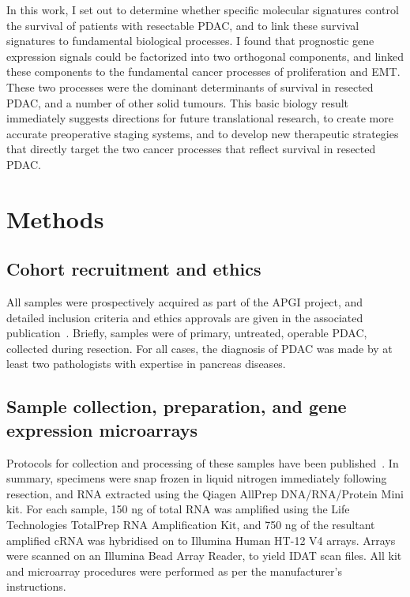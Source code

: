 \documentclass[dissertation.tex]{subfiles}
\begin{document}
In this work, I set out to determine whether specific molecular signatures control the survival of patients with resectable \gls{PDAC}, and to link these survival signatures to fundamental biological processes.  I found that prognostic gene expression signals could be factorized into two orthogonal components, and linked these components to the fundamental cancer processes of proliferation and \gls{EMT}.  These two processes were the dominant determinants of survival in resected \gls{PDAC}, and a number of other solid tumours.  This basic biology result immediately suggests directions for future translational research, to create more accurate preoperative staging systems, and to develop new therapeutic strategies that directly target the two cancer processes that reflect survival in resected \gls{PDAC}.

\section{Methods}
\subsection{Cohort recruitment and ethics}
All samples were prospectively acquired as part of the \gls{APGI} project, and detailed inclusion criteria and ethics approvals are given in the associated publication~\cite{Biankin2012}.  Briefly, samples were of primary, untreated, operable \gls{PDAC}, collected during resection.  For all cases, the diagnosis of \gls{PDAC} was made by at least two pathologists with expertise in pancreas diseases.

\subsection{Sample collection, preparation, and gene expression microarrays}
Protocols for collection and processing of these samples have been published~\cite{Biankin2012}.  In summary, specimens were snap frozen in liquid nitrogen immediately following resection, and RNA extracted using the Qiagen AllPrep DNA/RNA/Protein Mini kit.  For each sample, 150 ng of total RNA was amplified using the Life Technologies TotalPrep RNA Amplification Kit, and 750 ng of the resultant amplified cRNA was hybridised on to Illumina Human HT-12 V4 arrays.  Arrays were scanned on an Illumina Bead Array Reader, to yield \gls{IDAT} scan files.  All kit and microarray procedures were performed as per the manufacturer's instructions.
\end{document}
